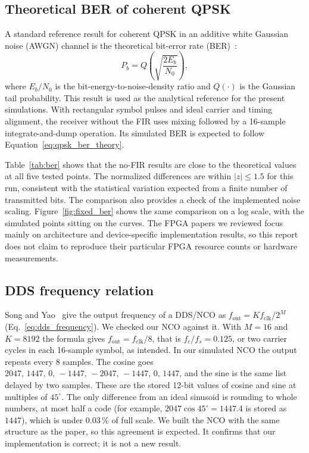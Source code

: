 \documentclass[10pt,twocolumn,letterpaper]{article}
\begin{document}
\subsection{Theoretical BER of coherent QPSK}
A standard reference result for coherent QPSK in an additive white Gaussian noise (AWGN) channel is the theoretical bit-error rate (BER)~\cite{proakis2002communication}:
\begin{equation}
 P_b=Q\!\left(\sqrt{\frac{2E_b}{N_0}}\right),
 \label{eq:qpsk_ber_theory}
\end{equation}
where $E_b/N_0$ is the bit-energy-to-noise-density ratio and $Q(\cdot)$ is the Gaussian tail probability. This result is used as the analytical reference for the present simulations. With rectangular symbol pulses and ideal carrier and timing alignment, the receiver without the FIR uses mixing followed by a 16-sample integrate-and-dump operation. Its simulated BER is expected to follow Equation~\ref{eq:qpsk_ber_theory}.

Table~\ref{tab:ber} shows that the no-FIR results are close to the theoretical values at all five tested points. The normalized differences are within $|z|\leq 1.5$ for this run, consistent with the statistical variation expected from a finite number of transmitted bits. The comparison also provides a check of the implemented noise scaling. Figure~\ref{fig:fixed_ber} shows the same comparison on a log scale, with the simulated points sitting on the curves. The FPGA papers we reviewed focus mainly on architecture and device-specific implementation results, so this report does not claim to reproduce their particular FPGA resource counts or hardware measurements.

\subsection{DDS frequency relation}
Song and Yao~\cite{song2010qpsk} give the output frequency of a DDS/NCO as
$f_{\mathrm{out}}=Kf_{\mathrm{clk}}/2^M$
(Eq.~\ref{eq:dds_frequency}). We checked our NCO against it. With $M=16$ and
$K=8192$ the formula gives $f_{\mathrm{out}}=f_{\mathrm{clk}}/8$, that is
$f_c/f_s=0.125$, or two carrier cycles in each 16-sample symbol, as intended.
In our simulated NCO the output repeats every 8 samples. The cosine goes
$2047,\,1447,\,0,\,-1447,\,-2047,\,-1447,\,0,\,1447$, and the sine is the
same list delayed by two samples. These are the stored 12-bit values of
cosine and sine at multiples of $45^\circ$. The only difference from an ideal
sinusoid is rounding to whole numbers, at most half a code (for example,
$2047\cos 45^\circ=1447.4$ is stored as $1447$), which is under
$0.03\,\%$ of full scale. We built the NCO with the same structure as the
paper, so this agreement is expected. It confirms that our implementation is
correct; it is not a new result.
\end{document}
